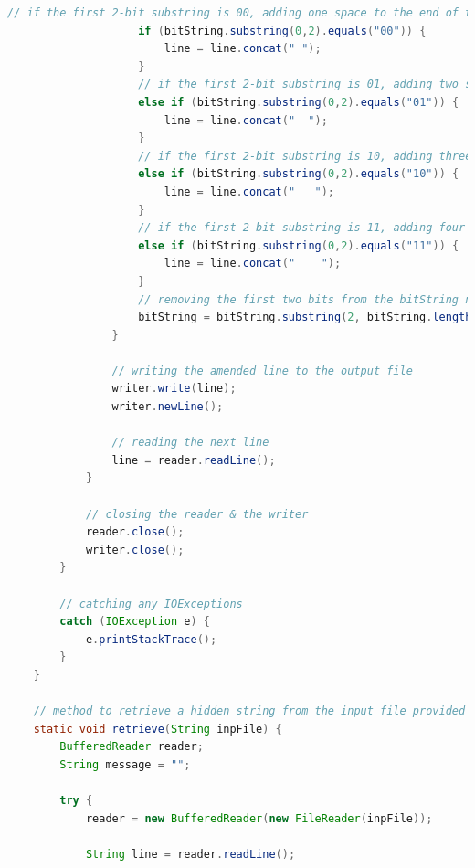 \documentclass[a4paper]{article}
\begin{document}
\begin{lstlisting}[language=java]
                    // if the first 2-bit substring is 00, adding one space to the end of the line
                    if (bitString.substring(0,2).equals("00")) {
                        line = line.concat(" ");
                    }
                    // if the first 2-bit substring is 01, adding two spaces to the end of the line
                    else if (bitString.substring(0,2).equals("01")) {
                        line = line.concat("  ");
                    }
                    // if the first 2-bit substring is 10, adding three spaces to the end of the line
                    else if (bitString.substring(0,2).equals("10")) {
                        line = line.concat("   ");
                    }
                    // if the first 2-bit substring is 11, adding four spaces to the end of the line
                    else if (bitString.substring(0,2).equals("11")) {
                        line = line.concat("    ");
                    }
                    // removing the first two bits from the bitString now that they have been used
                    bitString = bitString.substring(2, bitString.length());     // replacing bitString with it's substring that goes from the third character to the last character
                }

                // writing the amended line to the output file
                writer.write(line);
                writer.newLine();

		        // reading the next line
		        line = reader.readLine();
            }

            // closing the reader & the writer
            reader.close();
            writer.close();
	    }

        // catching any IOExceptions
        catch (IOException e) {
	        e.printStackTrace();
	    }
    }
    
    // method to retrieve a hidden string from the input file provided
    static void retrieve(String inpFile) {
        BufferedReader reader;                                                  // declaring a BufferedReader for the input file (inpFile)
        String message = "";

        try {
            reader = new BufferedReader(new FileReader(inpFile));               // initialising the reader to a FileReader of the input file (inpFile) 
            
            String line = reader.readLine();                                    // reading in the first line from the input file
            

\end{lstlisting}
\end{document}
